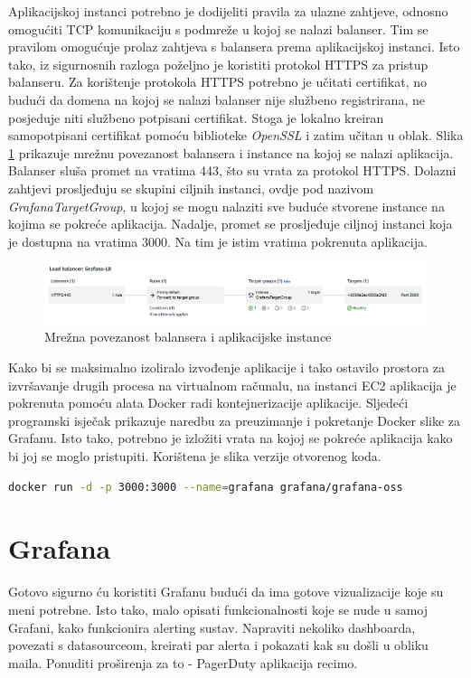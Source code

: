 Aplikacijskoj instanci potrebno je dodijeliti pravila za ulazne zahtjeve, odnosno omogućiti TCP komunikaciju s podmreže u kojoj se nalazi balanser. Tim se pravilom omogućuje prolaz zahtjeva s balansera prema aplikacijskoj instanci. Isto tako, iz sigurnosnih razloga poželjno je koristiti protokol HTTPS za pristup balanseru. Za korištenje protokola HTTPS potrebno je učitati certifikat, no budući da domena na kojoj se nalazi balanser nije službeno registrirana, ne posjeduje niti službeno potpisani certifikat. Stoga je lokalno kreiran samopotpisani certifikat pomoću biblioteke \textit{OpenSSL} i zatim učitan u oblak. Slika \ref{fig:load_balancer} prikazuje mrežnu povezanost balansera i instance na kojoj se nalazi aplikacija. Balanser sluša promet na vratima 443, što su vrata za protokol HTTPS. Dolazni zahtjevi prosljeđuju se skupini ciljnih instanci, ovdje pod nazivom \textit{GrafanaTargetGroup}, u kojoj se mogu nalaziti sve buduće stvorene instance na kojima se pokreće aplikacija. Nadalje, promet se prosljeđuje ciljnoj instanci koja je dostupna na vratima 3000. Na tim je istim vratima pokrenuta aplikacija. 

\begin{figure}[ht]
	\centering
	\includegraphics[scale=0.7]{imgs/load_balancer}
	\caption{Mrežna povezanost balansera i aplikacijske instance}
	\label{fig:load_balancer}
\end{figure}

Kako bi se maksimalno izoliralo izvođenje aplikacije i tako ostavilo prostora za izvršavanje drugih procesa na virtualnom računalu, na instanci EC2 aplikacija je pokrenuta pomoću alata Docker radi kontejnerizacije aplikacije. Sljedeći programski isječak prikazuje naredbu za preuzimanje i pokretanje Docker slike za Grafanu. Isto tako, potrebno je izložiti vrata na kojoj se pokreće aplikacija kako bi joj se moglo pristupiti. Korištena je slika verzije otvorenog koda.

\begin{lstlisting}[caption={Pokretanje Docker slike za Grafanu}, language=bash]
	docker run -d -p 3000:3000 --name=grafana grafana/grafana-oss
\end{lstlisting}


\section{Grafana}

Gotovo sigurno ću koristiti Grafanu budući da ima gotove vizualizacije koje su meni potrebne. Isto tako, malo opisati funkcionalnosti koje se nude u samoj Grafani, kako funkcionira alerting sustav. Napraviti nekoliko dashboarda, povezati s datasourceom, kreirati par alerta i pokazati kak su došli u obliku maila. Ponuditi proširenja za to - PagerDuty aplikacija recimo.